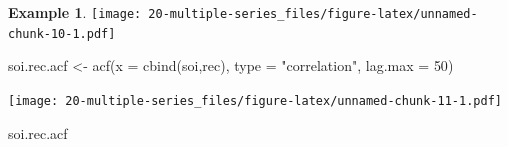 \documentclass[
]{book}
\newenvironment{Shaded}{\begin{snugshade}}{\end{snugshade}}
\newcommand{\AttributeTok}[1]{\textcolor[rgb]{0.77,0.63,0.00}{#1}}
\newcommand{\DecValTok}[1]{\textcolor[rgb]{0.00,0.00,0.81}{#1}}
\newcommand{\FunctionTok}[1]{\textcolor[rgb]{0.00,0.00,0.00}{#1}}
\newcommand{\NormalTok}[1]{#1}
\newcommand{\OtherTok}[1]{\textcolor[rgb]{0.56,0.35,0.01}{#1}}
\newcommand{\StringTok}[1]{\textcolor[rgb]{0.31,0.60,0.02}{#1}}
\theoremstyle{definition}
\theoremstyle{definition}
\newtheorem{example}{Example}[chapter]
\theoremstyle{definition}
\theoremstyle{definition}
\theoremstyle{remark}
\begin{document}
\begin{example}
\texttt{[image: 20-multiple-series\_files/figure-latex/unnamed-chunk-10-1.pdf]}

\begin{Shaded}
\begin{Highlighting}[]
\NormalTok{soi.rec.acf }\OtherTok{\textless{}{-}} \FunctionTok{acf}\NormalTok{(}\AttributeTok{x =} \FunctionTok{cbind}\NormalTok{(soi,rec), }\AttributeTok{type =} 
    \StringTok{"correlation"}\NormalTok{, }\AttributeTok{lag.max =} \DecValTok{50}\NormalTok{)}
\end{Highlighting}
\end{Shaded}

\texttt{[image: 20-multiple-series\_files/figure-latex/unnamed-chunk-11-1.pdf]}

\begin{Shaded}
\begin{Highlighting}[]
\NormalTok{soi.rec.acf}
\end{Highlighting}
\end{Shaded}


\end{example}
\end{document}
